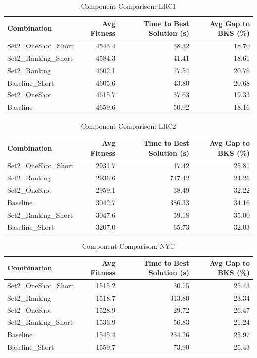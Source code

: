 \documentclass{article}
\begin{document}
\begin{table}[htbp]
\centering
\caption{Component Comparison: LRC1}
\label{tab:comparison_lrc1}
\begin{tabular}{lrrr}
\toprule
Combination & Avg Fitness & Time to Best Solution (s) & Avg Gap to BKS (\%) \\
\midrule
Set2\_OneShot\_Short & 4543.4 & 38.32 & 18.70 \\
Set2\_Ranking\_Short & 4584.3 & 41.41 & 18.61 \\
Set2\_Ranking & 4602.1 & 77.54 & 20.76 \\
Baseline\_Short & 4605.6 & 43.80 & 20.68 \\
Set2\_OneShot & 4615.7 & 37.63 & 19.33 \\
Baseline & 4659.6 & 50.92 & 18.16 \\
\bottomrule
\end{tabular}
\end{table}

\begin{table}[htbp]
\centering
\caption{Component Comparison: LRC2}
\label{tab:comparison_lrc2}
\begin{tabular}{lrrr}
\toprule
Combination & Avg Fitness & Time to Best Solution (s) & Avg Gap to BKS (\%) \\
\midrule
Set2\_OneShot\_Short & 2931.7 & 47.42 & 25.81 \\
Set2\_Ranking & 2936.6 & 747.42 & 24.26 \\
Set2\_OneShot & 2959.1 & 38.49 & 32.22 \\
Baseline & 3042.7 & 386.33 & 34.16 \\
Set2\_Ranking\_Short & 3047.6 & 59.18 & 35.00 \\
Baseline\_Short & 3207.0 & 65.73 & 32.03 \\
\bottomrule
\end{tabular}
\end{table}

\begin{table}[htbp]
\centering
\caption{Component Comparison: NYC}
\label{tab:comparison_nyc}
\begin{tabular}{lrrr}
\toprule
Combination & Avg Fitness & Time to Best Solution (s) & Avg Gap to BKS (\%) \\
\midrule
Set2\_OneShot\_Short & 1515.2 & 30.75 & 25.43 \\
Set2\_Ranking & 1518.7 & 313.80 & 23.34 \\
Set2\_OneShot & 1528.9 & 29.72 & 26.47 \\
Set2\_Ranking\_Short & 1536.9 & 56.83 & 21.24 \\
Baseline & 1545.4 & 234.26 & 25.97 \\
Baseline\_Short & 1559.7 & 73.90 & 25.43 \\
\bottomrule
\end{tabular}
\end{table}
\end{document}

